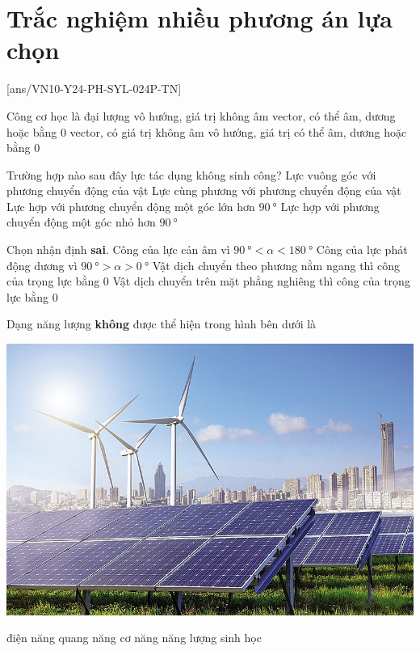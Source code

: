 \let\lesson\undefined
\newcommand{\lesson}{\phantomlesson{Bài 15.}}
\setcounter{section}{2}
\section{Trắc nghiệm nhiều phương án lựa chọn}
\setcounter{ex}{0}
[ans/VN10-Y24-PH-SYL-024P-TN]
\begin{ex}
Công cơ học là đại lượng	
	\choice
	{vô hướng, giá trị không âm}
	{vector, có thể âm, dương hoặc bằng 0}
	{vector, có giá trị không âm}
	{\True vô hướng, giá trị có thể âm, dương hoặc bằng 0}
	\loigiai{}
\end{ex}
\begin{ex}
	Trường hợp nào sau đây lực tác dụng không sinh công?
	\choice
	{\True Lực vuông góc với phương chuyển động của vật}
	{Lực cùng phương với phương chuyển động của vật}
	{Lực hợp với phương chuyển động một góc lớn hơn $\SI{90}{\degree}$}
	{Lực hợp với phương chuyển động một góc nhỏ hơn $\SI{90}{\degree}$}
\end{ex}	
	\begin{ex}
	Chọn nhận định \textbf{sai}.	
		\choice
		{Công của lực cản âm vì $\SI{90}{\degree} < \alpha <\SI{180}{\degree}$}
		{Công của lực phát động dương vì $\SI{90}{\degree} > \alpha >\SI{0}{\degree}$}
		{Vật dịch chuyển theo phương nằm ngang thì công của trọng lực bằng $0$}
		{\True Vật dịch chuyển trên mặt phẳng nghiêng thì công của trọng lực bằng $0$}
	\end{ex}
\begin{ex}
	Dạng năng lượng \textbf{không} được thể hiện trong hình bên dưới là
	\begin{center}
		\includegraphics[width=0.4\linewidth]{../figs/VN10-2023-PH-TP024-P-1}
	\end{center}
	\choice
	{điện năng}
	{quang năng}
	{cơ năng}
	{\True năng lượng sinh học}
	\loigiai{}
\end{ex}

